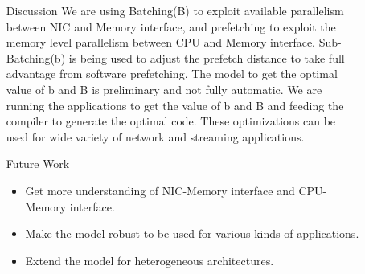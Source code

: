 \documentclass[final]{beamer}
\newlength{\sepwid}
\newlength{\onecolwid}
\newlength{\twocolwid}
\begin{document}
\begin{frame}
\begin{columns}[t]
\begin{column}{\twocolwid}
\begin{columns}[t,totalwidth=\twocolwid]
\begin{column}{\twocolwid}
\begin{exampleblock}{Experiments and Results}
\begin{multicols}{3}
\end{multicols}
\end{exampleblock}


\end{column} %
\begin{column}{\sepwid}\end{column} %
\end{columns} %

\end{column} %

\begin{column}{\sepwid}\end{column} %


\begin{column}{\onecolwid} %


\begin{exampleblock}{Discussion}
We are using Batching(B) to exploit available parallelism between NIC and Memory interface, and prefetching to exploit the memory level parallelism between CPU and Memory interface.
Sub-Batching(b) is being used to adjust the prefetch distance to take full advantage from software prefetching. The model to get the optimal value of b and B is preliminary and not fully automatic. We are running the applications to get the value of b and B and feeding the compiler to generate the optimal code. These optimizations can be used for wide variety of network and streaming applications.
\end{exampleblock}


\begin{exampleblock}{Future Work}
\begin{itemize}
\item Get more understanding of NIC-Memory interface and CPU-Memory interface. 
\item Make the model robust to be used for various kinds of applications.
\item Extend the model for heterogeneous architectures.
\end{itemize}
\end{exampleblock}


\end{column}
\end{columns}
\end{frame}
\end{document}
